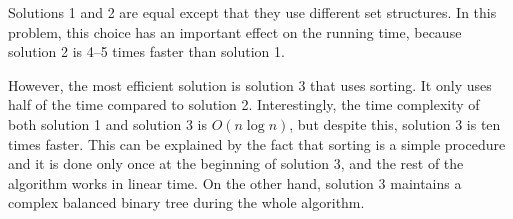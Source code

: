 Solutions 1 and 2 are equal except that
they use different set structures.
In this problem, this choice has an important effect on
the running time, because solution 2
is 4–5 times faster than solution 1.

However, the most efficient solution is solution 3
that uses sorting.
It only uses half of the time compared to solution 2.
Interestingly, the time complexity of both
solution 1 and solution 3 is $O(n \log n)$,
but despite this, solution 3 is ten times faster.
This can be explained by the fact that
sorting is a simple procedure and it is done
only once at the beginning of solution 3,
and the rest of the algorithm works in linear time.
On the other hand,
solution 3 maintains a complex balanced binary tree
during the whole algorithm.